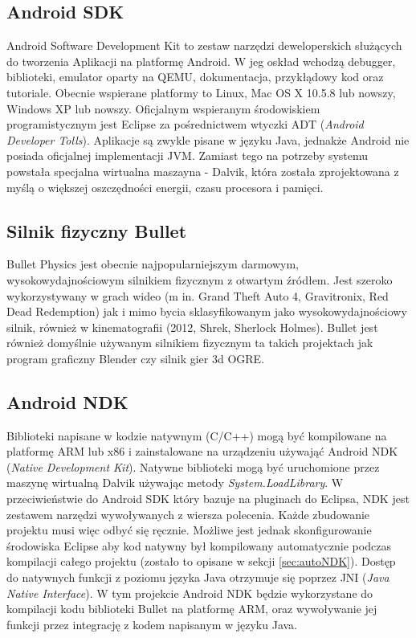 \subsection{Android SDK}
Android Software Development Kit to zestaw narzędzi deweloperskich służących do
tworzenia Aplikacji na platformę Android. W jeg oskład wchodzą debugger,
biblioteki, emulator oparty na QEMU, dokumentacja, przykłądowy kod oraz
tutoriale. Obecnie wspierane platformy to Linux, Mac OS X 10.5.8 lub nowszy,
Windows XP lub nowszy. Oficjalnym wspieranym środowiskiem programistycznym jest
Eclipse za pośrednictwem wtyczki ADT (\emph{Android Developer Tolls}). Aplikacje
są zwykle pisane w języku Java, jednakże Android nie posiada oficjalnej
implementacji JVM. Zamiast tego na potrzeby systemu powstała specjalna
wirtualna maszayna - Dalvik, która została zprojektowana z myślą o większej
oszczędności energii, czasu procesora i pamięci.

\subsection{Silnik fizyczny Bullet}
Bullet Physics jest obecnie najpopularniejszym darmowym, wysokowydajnościowym
silnikiem fizycznym z otwartym źródłem. Jest szeroko wykorzystywany w grach
wideo (m in. Grand Theft Auto 4, Gravitronix, Red Dead Redemption) jak i
mimo bycia sklasyfikowanym jako wysokowydajnościowy silnik, również w
kinematografii (2012, Shrek, Sherlock Holmes). Bullet jest również domyślnie
używanym silnikiem fizycznym ta takich projektach jak program graficzny
Blender czy silnik gier 3d OGRE.

\subsection{Android NDK}
Biblioteki napisane w kodzie natywnym (C/C++) mogą być kompilowane na platformę
ARM lub x86 i zainstalowane na urządzeniu używająć Android NDK (\emph{Native
Development Kit}). Natywne biblioteki mogą być uruchomione przez maszynę
wirtualną Dalvik używając metody \emph{System.LoadLibrary}. W przeciwieństwie do
Android SDK który bazuje na pluginach do Eclipsa, NDK jest zestawem narzędzi
wywoływanych z wiersza polecenia. Każde zbudowanie projektu musi więc odbyć się
ręcznie. Możliwe jest jednak skonfigurowanie środowiska Eclipse aby kod natywny
był kompilowany automatycznie podczas kompilacji całego projektu (zostało to
opisane w sekcji \ref{sec:autoNDK}). Dostęp do natywnych funkcji z poziomu
języka Java otrzymuje się poprzez JNI (\emph{Java Native Interface}). W tym
projekcie Android NDK będzie wykorzystane do kompilacji kodu biblioteki Bullet
na platformę ARM, oraz wywoływanie jej funkcji przez integrację z kodem
napisanym w języku Java.

